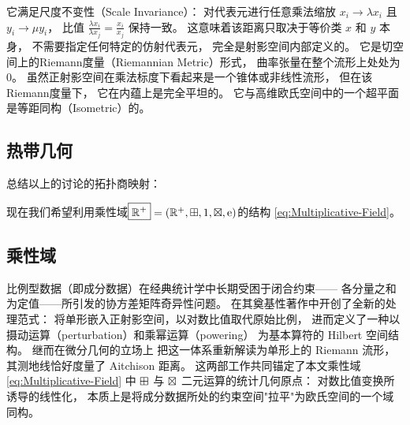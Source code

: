 ﻿\documentclass[10pt,a4paper]{article}
\numberwithin{equation}{section}
\begin{document}
它满足尺度不变性（Scale Invariance）：
对代表元进行任意乘法缩放
$x_i \to \lambda x_i$ 且 $y_i \to \mu y_i$，
比值 $\frac{\lambda x_i}{\lambda x_j} = \frac{x_i}{x_j}$ 保持一致。
这意味着该距离只取决于等价类 $x$ 和 $y$ 本身，
不需要指定任何特定的仿射代表元，
完全是射影空间内部定义的。
它是切空间上的Riemann度量（Riemannian Metric）形式，
曲率张量在整个流形上处处为$0$。
虽然正射影空间在乘法标度下看起来是一个锥体或非线性流形，
但在该Riemann度量下，
它在内蕴上是完全平坦的。
它与高维欧氏空间中的一个超平面是等距同构（Isometric）的。


\subsection{热带几何}


总结以上的讨论的拓扑商映射：


现在我们希望利用乘性域$\boxed{\mathbb R^+} = (\mathbb R^+,\mathbin{\boxplus},1,\mathbin{\boxtimes},\text e)$的结构
\eqref{eq:Multiplicative-Field}。


\subsection{乘性域}

比例型数据（即成分数据）在经典统计学中长期受困于闭合约束——
各分量之和为定值——所引发的协方差矩阵奇异性问题。
\textcite{Aitchison1986} 在其奠基性著作中开创了全新的处理范式：
将单形嵌入正射影空间，以对数比值取代原始比例，
进而定义了一种以摄动运算（perturbation）和乘幂运算（powering）
为基本算符的 Hilbert 空间结构。
\textcite{PawlowskyGlahnEgozcue2001} 继而在微分几何的立场上
把这一体系重新解读为单形上的 Riemann 流形，
其测地线恰好度量了 Aitchison 距离。
这两部工作共同锚定了本文乘性域 \eqref{eq:Multiplicative-Field} 中
$\mathbin{\boxplus}$ 与 $\mathbin{\boxtimes}$ 二元运算的统计几何原点：
对数比值变换所诱导的线性化，
本质上是将成分数据所处的约束空间"拉平"为欧氏空间的一个域同构。
\end{document}
